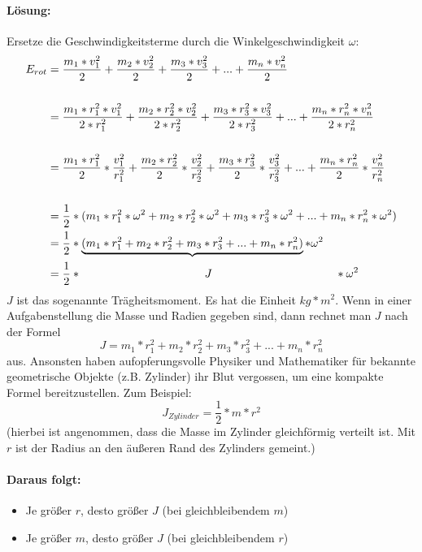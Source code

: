 	\paragraph{Lösung:}
	Ersetze die Geschwindigkeitsterme durch die Winkelgeschwindigkeit $ \omega $:
	\begin{align}
		E_{rot} &= \dfrac{m_1*v_1^2}{2}+\dfrac{m_2*v_2^2}{2}+\dfrac{m_3*v_3^2}{2}+...+\dfrac{m_n*v_n^2}{2}\\
		\nonumber\\
		&= \dfrac{m_1*r_1^2*v_1^2}{2*r_1^2}+\dfrac{m_2*r_2^2*v_2^2}{2*r_2^2}+\dfrac{m_3*r_3^2*v_3^2}{2*r_3^2}+...+\dfrac{m_n*r_n^2*v_n^2}{2*r_n^2}\\
		\nonumber\\
		&= \dfrac{m_1*r_1^2}{2}*\dfrac{v_1^2}{r_1^2}+\dfrac{m_2*r_2^2}{2}*\dfrac{v_2^2}{r_2^2}+\dfrac{m_3*r_3^2}{2}*\dfrac{v_3^2}{r_3^2}+...+\dfrac{m_n*r_n^2}{2}*\dfrac{v_n^2}{r_n^2}\\
		\nonumber\\
		&= \dfrac{1}{2}*(m_1*r_1^2*\omega^2+m_2*r_2^2*\omega^2+m_3*r_3^2*\omega^2+...+m_n*r_n^2*\omega^2)\\
		&= \dfrac{1}{2}*\underbrace{(m_1*r_1^2+m_2*r_2^2+m_3*r_3^2+...+m_n*r_n^2)}*\omega^2\\
		&= \dfrac{1}{2}* \hspace{3.8cm} J \hspace{3.8cm}*\omega^2
	\end{align}
	$J$ ist das sogenannte Trägheitsmoment. Es hat die Einheit $ kg*m^2 $. Wenn in einer Aufgabenstellung die Masse und Radien gegeben sind, dann rechnet man $J$ nach der Formel
	\begin{equation}
		J = m_1*r_1^2+m_2*r_2^2+m_3*r_3^2+...+m_n*r_n^2
	\end{equation}
	aus. Ansonsten haben aufopferungsvolle Physiker und Mathematiker für bekannte geometrische Objekte (z.B. Zylinder) ihr Blut vergossen, um eine kompakte Formel bereitzustellen. Zum Beispiel:
	\begin{equation}
		J_{Zylinder} = \dfrac{1}{2}*m*r^2
	\end{equation}
	(hierbei ist angenommen, dass die Masse im Zylinder gleichförmig verteilt ist. Mit $ r $ ist der Radius an den äußeren Rand des Zylinders gemeint.)
	\paragraph{Daraus folgt:}
	\begin{itemize}
		\item Je größer $ r $, desto größer $ J $ \quad (bei gleichbleibendem $ m $)
		\item Je größer $ m $, desto größer $ J $ \quad (bei gleichbleibendem $ r $)
	\end{itemize}
